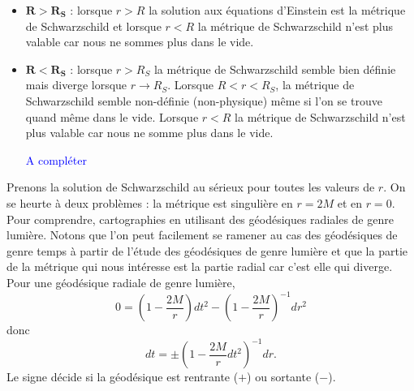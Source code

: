 \documentclass[a4paper,11pt]{report}
\theoremstyle{definition}
\theoremstyle{plain}
\theoremstyle{definition}
\theoremstyle{remark}
\newcommand{\comp}{\begin{center}\textcolor{blue}{A compléter}\end{center}}
\begin{document}
        \begin{itemize}[label = \textbullet]
            \item $\boldsymbol{R>R_S}$ : lorsque $r>R$ la solution aux équations d'Einstein est la métrique de Schwarzschild et lorsque $r<R$ la métrique de Schwarzschild n'est plus valable car nous ne sommes plus dans le vide.
            \item $\boldsymbol{R<R_S}$ : lorsque $r>R_S$ la métrique de Schwarzschild semble bien définie mais diverge lorsque $r\to R_S$. Lorsque $R<r<R_S$, la métrique de Schwarzschild semble non-définie (non-physique) même si l'on se trouve quand même dans le vide. Lorsque $r<R$ la métrique de Schwarzschild n'est plus valable car nous ne somme plus dans le vide.
            \comp
        \end{itemize}
        
         Prenons la solution de Schwarzschild au sérieux pour toutes les valeurs de $r$. On se heurte à deux problèmes : la métrique est singulière en $r=2M$ et en $r=0$. Pour comprendre, cartographies en utilisant des géodésiques radiales de genre lumière. Notons que l'on peut facilement se ramener au cas des géodésiques de genre temps à partir de l'étude des géodésiques de genre lumière et que la partie de la métrique qui nous intéresse est la partie radial car c'est elle qui diverge. Pour une géodésique radiale de genre lumière,
         \begin{equation}
             0 = \left( 1-\frac{2M}{r} \right)dt^2 - \left( 1-\frac{2M}{r} \right)^{-1}dr^2
         \end{equation}
         donc
         \begin{equation}
             dt = \pm \left( 1-\frac{2M}{r}dt^2 \right)^{-1} dr.
         \end{equation}
         Le signe décide si la géodésique est rentrante ($+$) ou sortante ($-$).
        
        
        
        
        
        
            
            
\end{document}
